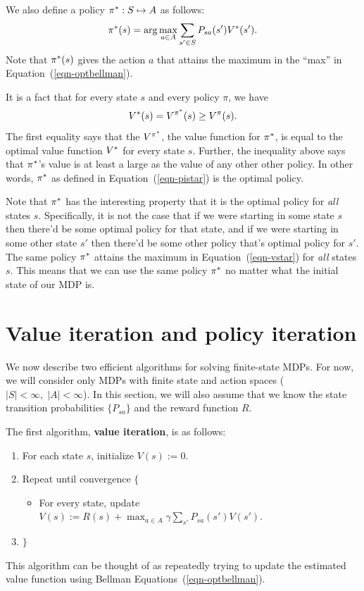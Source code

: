 \documentclass{article}
\begin{document}
We also define a policy ${\pi^{\ast}} : S \mapsto A$ as follows:
\begin{equation}
{\pi^{\ast}}(s) = \arg \max_{a \in A} \sum_{s'\in S} P_{sa}(s'){V^{\ast}}(s').
\label{eqn-pistar}
\end{equation}
Note that ${\pi^{\ast}}(s)$ gives the action $a$ that attains the maximum in
the ``max'' in Equation~(\ref{eqn-optbellman}).

It is a fact that for every state $s$ and every policy $\pi$, we have
\[
{V^{\ast}}(s) = V^{{\pi^{\ast}}}(s) \geq V^\pi(s).
\]
The first equality says that the $V^{{\pi^{\ast}}}$, the value function
for ${\pi^{\ast}}$, is equal to the optimal value function ${V^{\ast}}$ for every state $s$.
Further, the inequality above says that ${\pi^{\ast}}$'s value is at least a large
as the
value of any other other policy.  In other words, ${\pi^{\ast}}$ as defined in
Equation~(\ref{eqn-pistar}) is the optimal policy.

Note that ${\pi^{\ast}}$ has the interesting property that it is the
optimal policy for \emph{all} states $s$.  Specifically, it is not the case
that if we were starting in some state $s$ then there'd be some optimal policy
for that state, and if we were starting in some other state $s'$ then there'd
be some other policy that's optimal policy for $s'$.  The same
policy ${\pi^{\ast}}$ attains the maximum in Equation~(\ref{eqn-vstar}) for
\emph{all} states $s$.  This means that we can
use the same policy ${\pi^{\ast}}$ no matter what the
initial state of our MDP is.


\section{Value iteration and policy iteration} \label{sec-viandpi}

We now describe two efficient algorithms for solving finite-state MDPs.  For now,
we will consider only MDPs with finite state and action spaces ($|S| < \infty,\;
|A| < \infty$). In this section, we will also assume that we know the state transition probabilities $\{P_{sa}\}$ and the reward function $R$. 

The first algorithm, {\bf value iteration}, is as follows:
\begin{enumerate}
\item For each state $s$, initialize $V(s) := 0$.
\item Repeat until convergence $\{$
\begin{itemize}
\item[] For every state, update
$V(s) := R(s) + \max_{a \in A} \gamma \sum_{s'} P_{sa}(s') V(s')$.
\end{itemize}
\item[] $\}$
\end{enumerate}
This algorithm can be thought of as repeatedly trying to update the estimated
value function using Bellman Equations~(\ref{eqn-optbellman}).
\end{document}

